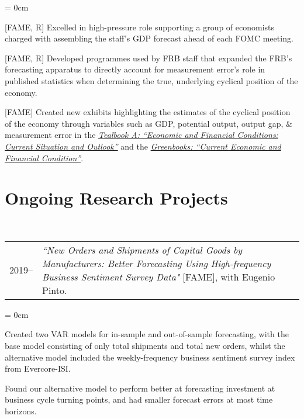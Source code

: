\documentclass[a4paper, 11pt]{article}
\begin{document}
    \begin{compactitem}\parskip = 0cm
      \item {[FAME, R]} Excelled in high-pressure role supporting a group of economists charged with assembling the staff's GDP forecast ahead of each FOMC meeting.
      \item {[FAME, R]} Developed programmes used by FRB staff that expanded the FRB's forecasting apparatus to directly account for measurement error's role in published statistics when determining the true, underlying cyclical position of the economy.
      \item {[FAME]} Created new exhibits highlighting the estimates of the cyclical position of the economy through variables such as GDP, potential output, output gap, \& measurement error in the \href{https://www.federalreserve.gov/monetarypolicy/fomc_historical.htm#tealbooks}{\textit{Tealbook A: ``Economic and Financial Conditions: Current Situation and Outlook''}} and the \href{https://www.federalreserve.gov/monetarypolicy/fomc_historical.htm#greenbooks}{\textit{Greenbooks: ``Current Economic and Financial Condition''}}.
    \end{compactitem}

  \section{Ongoing Research Projects}
    ~\begin{tabular}{lP{15cm}}
      2019--& \textit{``New Orders and Shipments of Capital Goods by Manufacturers: Better Forecasting Using} \textit{High-frequency Business Sentiment Survey Data"} {[FAME]}, with Eugenio Pinto.
    \end{tabular}

    \begin{compactitem}\parskip = 0cm
      \item Created two VAR models for in-sample and out-of-sample forecasting, with the base model consisting of only total shipments and total new orders, whilst the alternative model included the weekly-frequency business sentiment survey index from Evercore-ISI.
      \item Found our alternative model to perform better at forecasting investment at business cycle turning points, and had smaller forecast errors at most time horizons.
    \end{compactitem}
\end{document}
